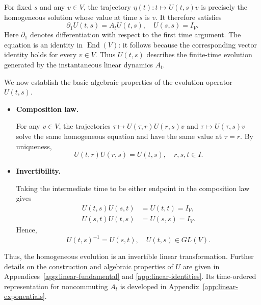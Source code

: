 \documentclass[12pt,a4paper,oneside]{book}
\begin{document}
\begin{example}
\begin{solution}
For fixed $s$ and any $v\in V$, the trajectory $\eta(t): t\mapsto U(t,s)v$ is precisely the homogeneous solution whose
value at time $s$ is $v$. It therefore satisfies
\begin{equation}
    \partial_1 U(t,s)=A_tU(t,s), \quad U(s,s)=I_V.
    \label{eq:fundamental-U}
\end{equation}
Here $\partial_1$ denotes differentiation with respect to the first time argument. The equation is an identity in
$\operatorname{End}(V)$: it follows because the corresponding vector identity holds for every $v\in V$. Thus $U(t,s)$
describes the finite-time evolution generated by the instantaneous linear dynamics $A_t$.

We now establish the basic algebraic properties of the evolution operator $U(t,s)$.
\begin{itemize}
    \item \textbf{Composition law.}

        For any $v\in V$, the trajectories $\tau\mapsto U(\tau,r)U(r,s)v$ and $\tau\mapsto U(\tau,s)v$ solve the same homogeneous
        equation and have the same value at $\tau=r$. By uniqueness,
        \begin{equation*}
            U(t,r)U(r,s)=U(t,s), \quad r,s,t\in I.
        \end{equation*}

    \item \textbf{Invertibility.}

        Taking the intermediate time to be either endpoint in the composition law gives
        \begin{equation*}
            \begin{aligned}
                U(t,s)U(s,t)&=U(t,t)=I_V,\\
                U(s,t)U(t,s)&=U(s,s)=I_V.
            \end{aligned}
        \end{equation*}
        Hence,
        \begin{equation*}
            U(t,s)^{-1}=U(s,t), \quad U(t,s)\in GL(V).
        \end{equation*}
\end{itemize}
Thus, the homogeneous evolution is an invertible linear transformation. Further details on the construction and algebraic
properties of $U$ are given in Appendices~\ref{app:linear-fundamental} and \ref{app:linear-identities}. Its time-ordered
representation for noncommuting $A_t$ is developed in Appendix~\ref{app:linear-exponentials}.


\end{solution}
\end{example}
\end{document}

